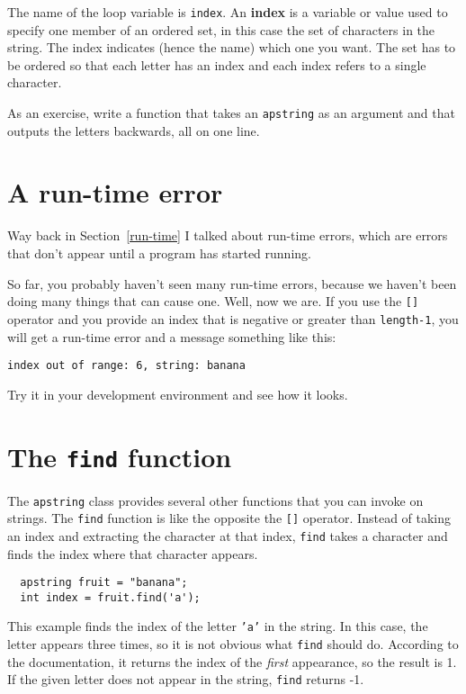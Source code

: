 
The name of the loop variable is {\tt index}.  An {\bf
index} is a variable or value used to specify one member of an ordered
set, in this case the set of characters in the string.  The index
indicates (hence the name) which one you want.  The set has to be
ordered so that each letter has an index and each index
refers to a single character.

As an exercise, write a function that takes an {\tt apstring}
as an argument and that outputs the letters backwards, all on
one line.

\section{A run-time error}

Way back in Section~\ref{run-time} I talked about run-time errors,
which are errors that don't appear until a program has started
running.

So far, you probably haven't seen many run-time errors, because we
haven't been doing many things that can cause one.  Well, now we are.
If you use the {\tt []} operator and you provide an index that is
negative or greater than {\tt length-1}, you will get a run-time
error and a message something like this:

\begin{verbatim}
index out of range: 6, string: banana
\end{verbatim}
%
Try it in your development environment and see how it looks.

\section{The {\tt find} function}

The {\tt apstring} class provides several other functions that you can
invoke on strings.  The {\tt find} function is like the opposite the
{\tt []} operator.  Instead of taking an index and extracting the
character at that index, {\tt find} takes a character and finds the
index where that character appears.

\begin{verbatim}
  apstring fruit = "banana";
  int index = fruit.find('a');
\end{verbatim}
%
This example finds the index of the letter {\tt 'a'} in the string.
In this case, the letter appears three times, so it is not obvious
what {\tt find} should do.  According to the documentation, it returns
the index of the {\em first} appearance, so the result is 1.  If the
given letter does not appear in the string, {\tt find} returns -1.

